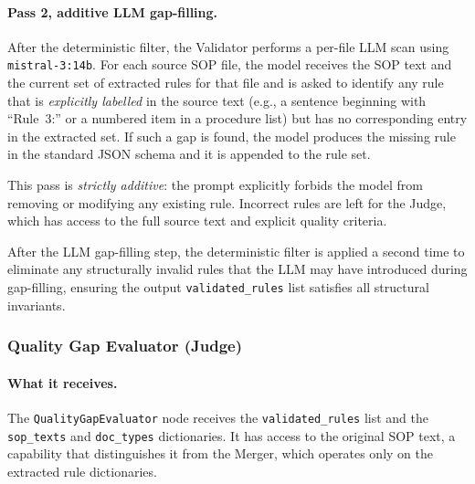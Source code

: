 ﻿\documentclass[11pt]{article}
\begin{document}
\paragraph{Pass 2, additive LLM gap-filling.}
After the deterministic filter, the Validator performs a per-file LLM scan using
\texttt{mistral-3:14b}.  For each source SOP file, the model receives the SOP
text and the current set of extracted rules for that file and is asked to identify
any rule that is \emph{explicitly labelled} in the source text (e.g., a sentence
beginning with ``Rule~3:'' or a numbered item in a procedure list) but has no
corresponding entry in the extracted set.  If such a gap is found, the model
produces the missing rule in the standard JSON schema and it is appended to the
rule set.

This pass is \emph{strictly additive}: the prompt explicitly forbids the model
from removing or modifying any existing rule.  Incorrect rules are left for the
Judge, which has access to the full source text and explicit quality criteria.

After the LLM gap-filling step, the deterministic filter is applied a second
time to eliminate any structurally invalid rules that the LLM may have
introduced during gap-filling, ensuring the output \texttt{validated\_rules}
list satisfies all structural invariants.

\subsubsection{Quality Gap Evaluator (Judge)}
\label{sec:judge}

\paragraph{What it receives.}
The \texttt{QualityGapEvaluator} node receives the \texttt{validated\_rules} list
and the \texttt{sop\_texts} and \texttt{doc\_types} dictionaries.  It has access to
the original SOP text, a capability that distinguishes it from the Merger, which
operates only on the extracted rule dictionaries.
\end{document}
